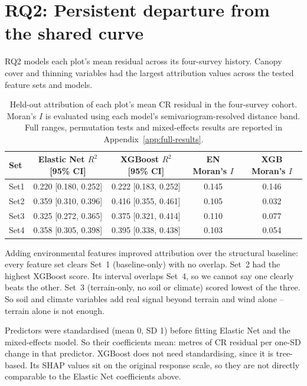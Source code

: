 \section{RQ2: Persistent departure from the shared curve}
\label{sec:results-rq2}

RQ2 models each plot's mean residual across its four-survey history. Canopy cover and thinning
variables had the largest attribution values across the tested feature sets and models.

\begin{table}[!htbp]
\centering
\scriptsize
\renewcommand{\arraystretch}{1.1}
\begin{tabular}{lcccc}
\toprule
Set & Elastic Net $R^2$ [95\% CI] & XGBoost $R^2$ [95\% CI]
& EN Moran's $I$ & XGB Moran's $I$ \\
\midrule
Set1 & 0.220 [0.180, 0.252] & 0.222 [0.183, 0.252] & 0.145 & 0.146 \\
Set2 & 0.359 [0.310, 0.396] & 0.416 [0.355, 0.461] & 0.105 & 0.032 \\
Set3 & 0.325 [0.272, 0.365] & 0.375 [0.321, 0.414] & 0.110 & 0.077 \\
Set4 & 0.358 [0.305, 0.398] & 0.395 [0.338, 0.438] & 0.103 & 0.054 \\
\bottomrule
\end{tabular}
\caption{Held-out attribution of each plot's mean CR residual in the four-survey cohort. Moran's
$I$ is evaluated using each model's semivariogram-resolved distance band. Full ranges, permutation
tests and mixed-effects results are reported in Appendix~\ref{app:full-results}.}
\label{tab:results-rq2}
\end{table}

Adding environmental features improved attribution over the structural baseline: every feature
set clears Set~1 (baseline-only) with no overlap. Set~2 had the highest XGBoost score. Its
interval overlaps Set~4, so we cannot say one clearly beats the other. Set~3 (terrain-only, no
soil or climate) scored lowest of the three. So soil and climate variables add real signal beyond
terrain and wind alone -- terrain alone is not enough.

Predictors were standardised (mean 0, SD 1) before fitting Elastic Net and the mixed-effects
model. So their coefficients mean: metres of CR residual per one-SD change in that predictor.
XGBoost does not need standardising, since it is tree-based. Its SHAP values sit on the original
response scale, so they are not directly comparable to the Elastic Net coefficients above.

